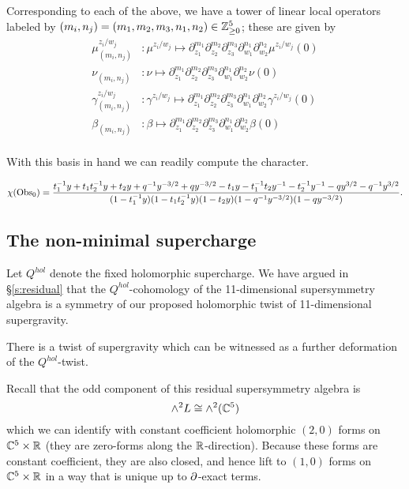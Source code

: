 \documentclass[11pt]{amsart}
\begin{document}
Corresponding to each of the above, we have a tower of linear local operators labeled by $(m_i, n_j) = (m_1, m_2, m_3, n_1,  n_2)\in \mathbb{Z}^5_{\geq 0}$; these are given by
\begin{align*}
\mu^{z_i/w_j}_{(m_i, n_j)} &: \mu^{z_i/w_j}\mapsto \partial_{z_1}^{m_1}\partial_{z_2}^{m_2}\partial_{z_3}^{m_3}\partial_{w_1}^{n_1}\partial_{w_2}^{n_2}\mu^{z_i/w_j} (0) \\
\nu_{(m_i, n_j)} &: \nu\mapsto \partial_{z_1}^{m_1}\partial_{z_2}^{m_2}\partial_{z_3}^{m_3}\partial_{w_1}^{n_1}\partial_{w_2}^{n_2}\nu (0) \\
\gamma^{z_i/w_j}_{(m_i, n_j)} &: \gamma^{z_i/w_j}\mapsto \partial_{z_1}^{m_1}\partial_{z_2}^{m_2}\partial_{z_3}^{m_3}\partial_{w_1}^{n_1}\partial_{w_2}^{n_2}\gamma^{z_i/w_j} (0) \\
\beta_{(m_i, n_j)} &: \beta\mapsto \partial_{z_1}^{m_1}\partial_{z_2}^{m_2}\partial_{z_3}^{m_3}\partial_{w_1}^{n_1}\partial_{w_2}^{n_2}\beta (0) \\
\end{align*}

With this basis in hand we can readily compute the character. 
\begin{lem}
\[\chi ({\rm Obs}_0) = \frac{t_1^{-1}y+ t_1t_2^{-1}y+t_2y+q^{-1}y^{-3/2}+qy^{-3/2}-t_1y- t_1^{-1}t_2y^{-1}-t_2^{-1}y^{-1}-qy^{3/2}-q^{-1}y^{3/2}}{(1-t_1^{-1}y)(1-t_1t_2^{-1}y)(1-t_2y)(1-q^{-1}y^{-3/2})(1-qy^{-3/2})}.\]
\end{lem}


\subsection{The non-minimal supercharge}

Let $Q^{hol}$ denote the fixed holomorphic supercharge. 
We have argued in \S \ref{s:residual} that the $Q^{hol}$-cohomology of the 11-dimensional supersymmetry algebra is a symmetry of our proposed holomorphic twist of 11-dimensional supergravity. 

There is a twist of supergravity which can be witnessed as a further deformation of the $Q^{hol}$-twist. 

Recall that the odd component of this residual supersymmetry algebra is
\[
\wedge^2 L \cong \wedge^2(\mathbb C^5) 
\]
which we can identify with constant coefficient holomorphic $(2,0)$ forms on $\mathbb C^5 \times \mathbb R$ (they are zero-forms along the $\mathbb R$-direction). 
Because these forms are constant coefficient, they are also closed, and hence lift to $(1,0)$ forms on $\mathbb C^5 \times \mathbb R$ in a way that is unique up to $\partial$-exact terms. 
\end{document}
